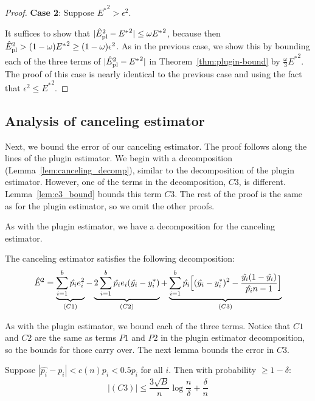 \begin{proof}
\textbf{Case 2}: Suppose ${E^*}^2 > \epsilon^2$.

It suffices to show that $| \hat{E}_{\textup{pl}}^2{} - {E^*}^2 | \leq \omega {E^*}^2$, because then $\hat{E}_{\textup{pl}}^2{} > (1 - \omega) {E^*}^2 \geq (1 - \omega) \epsilon^2$. As in the previous case, we show this by bounding each of the three terms of  $| \hat{E}_{\textup{pl}}^2{} - {E^*}^2 |$ in Theorem~\ref{thm:plugin-bound} by $\frac{\omega}{3}{E^*}^2$. The proof of this case is nearly identical to the previous case and using the fact that $\epsilon^2 \leq {E^*}^2$.

\end{proof}

\subsection{Analysis of canceling estimator}

Next, we bound the error of our canceling estimator. The proof follows along the lines of the plugin estimator. We begin with a decomposition (Lemma~\ref{lem:canceling_decomp}), similar to the decomposition of the plugin estimator. However, one of the terms in the decomposition, $C3$, is different. Lemma~\ref{lem:c3_bound} bounds this term $C3$. The rest of the proof is the same as for the plugin estimator, so we omit the other proofs.

As with the plugin estimator, we have a decomposition for the canceling estimator.

\begin{lemma}
\label{lem:canceling_decomp}
The canceling estimator satisfies the following decomposition:
\[ \hat{E}^2{} = \underbrace{\sum_{i=1}^b \hat{p_i}e_i^2}_{(C1)}  - \underbrace{2\sum_{i=1}^b \hat{p_i}e_i(\hat{y_i} - y_i^*)}_{(C2)} + \underbrace{\sum_{i=1}^b \hat{p_i}\Big[ (\hat{y_i} - y_i^*)^2 - \frac{\hat{y_i}(1 - \hat{y_i})}{\hat{p_i}n-1} \Big]}_{(C3)} \]
\end{lemma}

As with the plugin estimator, we bound each of the three terms. Notice that $C1$ and $C2$ are the same as terms $P1$ and $P2$ in the plugin estimator decomposition, so the bounds for those carry over. The next lemma bounds the error in $C3$.

\begin{lemma}[C3]
\label{lem:c3_bound}
Suppose $|\hat{p_i} - p_i| < c(n) p_i < 0.5 p_i$ for all $i$. Then with probability $\geq 1 - \delta$:
\[ |(C3)| \leq \frac{3\sqrt{B}}{n} \log{\frac{n}{\delta}} + \frac{\delta}{n} \]
\end{lemma}

